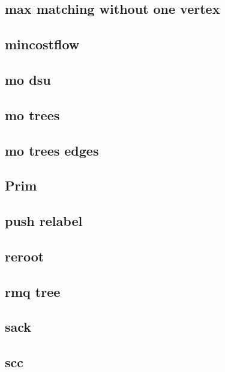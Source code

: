\subsection{max matching without one vertex}
\raggedbottom
\hrulefill
\subsection{mincostflow}
\raggedbottom
\hrulefill
\subsection{mo dsu}
\raggedbottom
\hrulefill
\subsection{mo trees}
\raggedbottom
\hrulefill
\subsection{mo trees edges}
\raggedbottom
\hrulefill
\subsection{Prim}
\raggedbottom
\hrulefill
\subsection{push relabel}
\raggedbottom
\hrulefill
\subsection{reroot}
\raggedbottom
\hrulefill
\subsection{rmq tree}
\raggedbottom
\hrulefill
\subsection{sack}
\raggedbottom
\hrulefill
\subsection{scc}
\raggedbottom
\hrulefill

